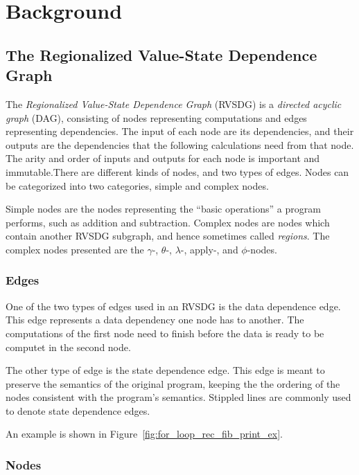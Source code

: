 
\clearpage
\section{Background}
\label{background}

\subsection{The Regionalized Value-State Dependence Graph}
\label{background:RVSDG}

The \textit{Regionalized Value-State Dependence Graph} (RVSDG) is a
\textit{directed acyclic graph} (DAG), consisting of nodes representing
computations and edges representing dependencies. The input of each node are its
dependencies, and their outputs are the dependencies that the following
calculations need from that node. The arity and order of inputs and outputs for
each node is important and immutable.There are different kinds of nodes, and two
types of edges. Nodes can be categorized into two categories, simple and complex
nodes.

Simple nodes are the nodes representing the ``basic operations'' a program
performs, such as addition and subtraction. Complex nodes are nodes which
contain another RVSDG subgraph, and hence sometimes called \textit{regions}. The
complex nodes presented are the $\gamma$-, $\theta$-, $\lambda$-, apply-, and
$\phi$-nodes.

\subsubsection{Edges}

One of the two types of edges used in an RVSDG is the data dependence edge. This
edge represents a data dependency one node has to another. The computations of
the first node need to finish before the data is ready to be computet in the
second node.

The other type of edge is the state dependence edge. This edge is meant to
preserve the semantics of the original program, keeping the  the ordering of the
nodes consistent with the program's semantics. Stippled lines are commonly used
to denote state dependence edges.

An example is shown in Figure~\ref{fig:for_loop_rec_fib_print_ex}.

\subsubsection{Nodes}

